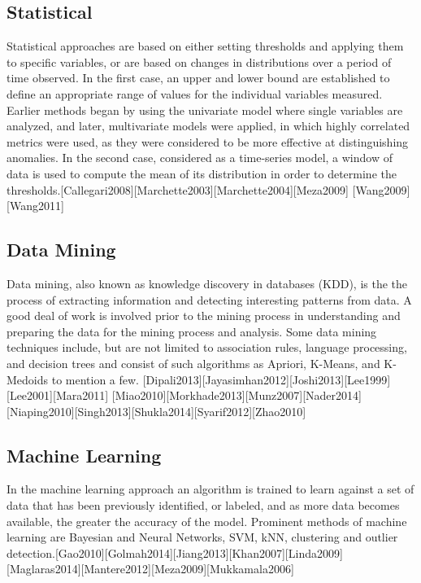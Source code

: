 \documentclass[12pt,]{article}
\begin{document}
\subsection{Statistical}\label{statistical}

Statistical approaches are based on either setting thresholds and
applying them to specific variables, or are based on changes in
distributions over a period of time observed. In the first case, an
upper and lower bound are established to define an appropriate range of
values for the individual variables measured. Earlier methods began by
using the univariate model where single variables are analyzed, and
later, multivariate models were applied, in which highly correlated
metrics were used, as they were considered to be more effective at
distinguishing anomalies. In the second case, considered as a
time-series model, a window of data is used to compute the mean of its
distribution in order to determine the
thresholds.{[}Callegari2008{]}{[}Marchette2003{]}{[}Marchette2004{]}{[}Meza2009{]}
{[}Wang2009{]}{[}Wang2011{]}

\subsection{Data Mining}\label{data-mining}

Data mining, also known as knowledge discovery in databases (KDD), is
the the process of extracting information and detecting interesting
patterns from data. A good deal of work is involved prior to the mining
process in understanding and preparing the data for the mining process
and analysis. Some data mining techniques include, but are not limited
to association rules, language processing, and decision trees and
consist of such algorithms as Apriori, K-Means, and K-Medoids to mention
a few.
{[}Dipali2013{]}{[}Jayasimhan2012{]}{[}Joshi2013{]}{[}Lee1999{]}{[}Lee2001{]}{[}Mara2011{]}
{[}Miao2010{]}{[}Morkhade2013{]}{[}Munz2007{]}{[}Nader2014{]}{[}Niaping2010{]}{[}Singh2013{]}{[}Shukla2014{]}{[}Syarif2012{]}{[}Zhao2010{]}

\subsection{Machine Learning}\label{machine-learning}

In the machine learning approach an algorithm is trained to learn
against a set of data that has been previously identified, or labeled,
and as more data becomes available, the greater the accuracy of the
model. Prominent methods of machine learning are Bayesian and Neural
Networks, SVM, kNN, clustering and outlier
detection.{[}Gao2010{]}{[}Golmah2014{]}{[}Jiang2013{]}{[}Khan2007{]}{[}Linda2009{]}
{[}Maglaras2014{]}{[}Mantere2012{]}{[}Meza2009{]}{[}Mukkamala2006{]}
\end{document}
